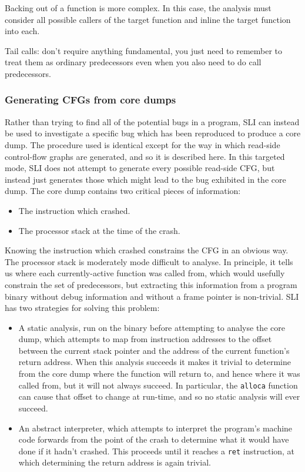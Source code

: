 Backing out of a function is more complex.  In this case, the analysis
must consider all possible callers of the target function and inline
the target function into each.


Tail calls: don't require anything fundamental, you just need to
remember to treat them as ordinary predecessors even when you also
need to do call predecessors.

\subsubsection{Generating CFGs from core dumps}

Rather than trying to find all of the potential bugs in a program, SLI
can instead be used to investigate a specific bug which has been
reproduced to produce a core dump.  The procedure used is identical
except for the way in which read-side control-flow graphs are
generated, and so it is described here.  In this targeted mode, SLI
does not attempt to generate every possible read-side CFG, but instead
just generates those which might lead to the bug exhibited in the core
dump.  The core dump contains two critical pieces of information:

\begin{itemize}
\item
  The instruction which crashed.
\item
  The processor stack at the time of the crash.
\end{itemize}

Knowing the instruction which crashed constrains the CFG in an obvious
way.  The processor stack is moderately mode difficult to analyse.  In
principle, it tells us where each currently-active function was called
from, which would usefully constrain the set of predecessors, but
extracting this information from a program binary without debug
information and without a frame pointer is non-trivial.  SLI has two
strategies for solving this problem:

\begin{itemize}
\item
  A static analysis, run on the binary before attempting to analyse
  the core dump, which attempts to map from instruction addresses to
  the offset between the current stack pointer and the address of the
  current function's return address.  When this analysis succeeds it
  makes it trivial to determine from the core dump where the function
  will return to, and hence where it was called from, but it will not
  always succeed.  In particular, the \verb|alloca| function can cause
  that offset to change at run-time, and so no static analysis will
  ever succeed.
\item
  An abstract interpreter, which attempts to interpret the program's
  machine code forwards from the point of the crash to determine what
  it would have done if it hadn't crashed.  This proceeds until it
  reaches a \verb|ret| instruction, at which determining the return
  address is again trivial.
\end{itemize}

